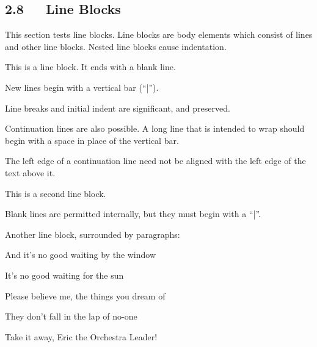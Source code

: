 \documentclass[a4paper]{article}
\newenvironment{DUlineblock}[1]{%
    \list{}{\setlength{\partopsep}{\parskip}
            \addtolength{\partopsep}{\baselineskip}
            \setlength{\topsep}{0pt}
            \setlength{\itemsep}{0.15\baselineskip}
            \setlength{\parsep}{0pt}
            \setlength{\leftmargin}{#1}}
    \raggedright
  }
  {\endlist}
\begin{document}
\subsection{2.8   Line Blocks}

This section tests line blocks.  Line blocks are body elements which
consist of lines and other line blocks.  Nested line blocks cause
indentation.

\begin{DUlineblock}{0em}
\item[] This is a line block.  It ends with a blank line.
\item[]
\begin{DUlineblock}{\DUlineblockindent}
\item[] New lines begin with a vertical bar (“|”).
\item[] Line breaks and initial indent are significant, and preserved.
\item[]
\begin{DUlineblock}{\DUlineblockindent}
\item[] Continuation lines are also possible.  A long line that is intended
to wrap should begin with a space in place of the vertical bar.
\end{DUlineblock}
\item[] The left edge of a continuation line need not be aligned with
the left edge of the text above it.
\end{DUlineblock}
\end{DUlineblock}

\begin{DUlineblock}{0em}
\item[] This is a second line block.
\item[] 
\item[] Blank lines are permitted internally, but they must begin with a “|”.
\end{DUlineblock}

Another line block, surrounded by paragraphs:

\begin{DUlineblock}{0em}
\item[] And it’s no good waiting by the window
\item[] It’s no good waiting for the sun
\item[] Please believe me, the things you dream of
\item[] They don’t fall in the lap of no-one
\end{DUlineblock}

Take it away, Eric the Orchestra Leader!
\end{document}
